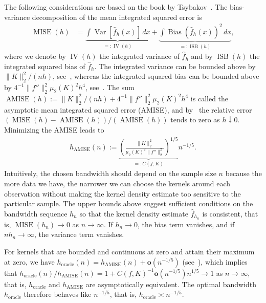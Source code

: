 The following considerations are based on the book by Tsybakov~\cite[Section~1.2]{tsybakov2009introduction}. The bias-variance decomposition of the mean integrated squared error is
\begin{align*}
    \operatorname{MISE}(h)&=\underbrace{\int\operatorname{Var}[\hat{f}_h(x)]\,dx}_{=:\operatorname{IV}(h)}+\underbrace{\int\operatorname{Bias}(\hat{f}_h(x))^2\,dx}_{=:\operatorname{ISB}(h)},
\end{align*}
where we denote by $\operatorname{IV}(h)$ the integrated variance of $\hat{f}_h$ and by $\operatorname{ISB}(h)$ the integrated squared bias of $\hat{f}_h$. The integrated variance can be bounded above by $\|K\|_2^2/(nh)$, see~\cite[Proposition~1.4]{tsybakov2009introduction}, whereas the integrated squared bias can be bounded above by $4^{-1}\|f''\|_2^2\mu_2(K)^2h^4$, see~\cite[Equations~(A.2) and~(A.4)]{tsybakov2009introduction}. The sum $\operatorname{AMISE}(h):=\|K\|_2^2/(nh)+4^{-1}\|f''\|_2^2\mu_2(K)^2h^4$ is called the asymptotic mean integrated squared error (AMISE), and by~\cite[Proposition~1.6]{tsybakov2009introduction} the relative error $(\operatorname{MISE}(h)-\operatorname{AMISE}(h))/(\operatorname{AMISE}(h))$ tends to zero as $h\downarrow0$. Minimizing the AMISE leads to
\begin{align}\label{eq:h_amise}
    h_{\operatorname{AMISE}}(n):=\underbrace{\left(\frac{\|K\|_2^2}{\mu_2(K)^2\|f''\|_2^2}\right)^{1/5}}_{=:C(f,K)}n^{-1/5}.
\end{align}
Intuitively, the chosen bandwidth should depend on the sample size $n$ because the more data we have, the narrower we can choose the kernels around each observation without making the kernel density estimate too sensitive to the particular sample. The upper bounds above suggest sufficient conditions on the bandwidth sequence $h_n$ so that the kernel density estimate $\hat{f}_{h_n}$ is consistent, that is, $\operatorname{MISE}(h_n)\to0$ as $n\to\infty$. If $h_n\to0$, the bias term vanishes, and if $nh_n\to\infty$, the variance term vanishes.

For kernels that are bounded and continuous at zero and attain their maximum at zero, we have $h_{\text{oracle}}(n)=h_{\operatorname{AMISE}}(n)+\mathbf{o}(n^{-1/5})$ (see~\cite[Equation~(8)]{chacon_existence_nodate}), which implies that $h_{\text{oracle}}(n)/h_{\operatorname{AMISE}}(n)=1+C(f,K)^{-1}\mathbf{o}(n^{-1/5})n^{1/5}\to1$ as $n\to\infty$, that is, $h_{\text{oracle}}$ and $h_{\operatorname{AMISE}}$ are asymptotically equivalent. The optimal bandwidth $h_{\text{oracle}}$ therefore behaves like $n^{-1/5}$, that is, $h_{\text{oracle}}\asymp n^{-1/5}$.

